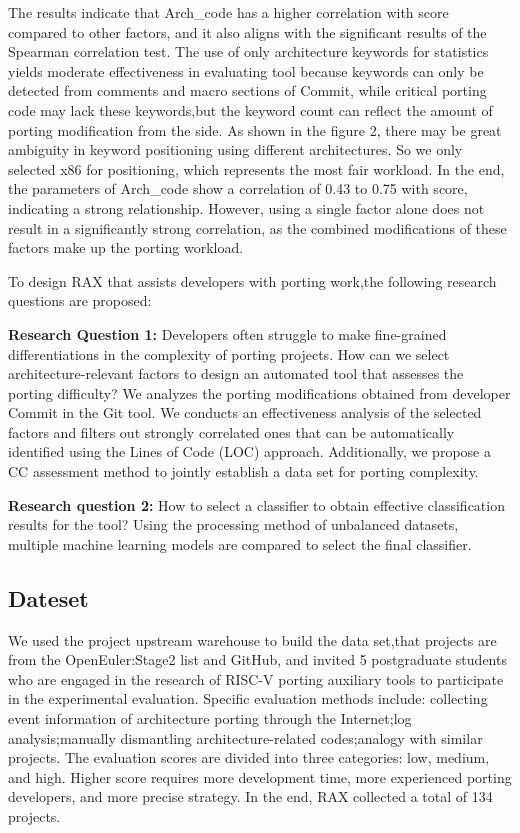 \documentclass[sigconf,screen,review]{acmart}
\begin{document}
The results indicate that Arch\_code has a higher correlation with score compared to other factors, and it also aligns with the significant results of the Spearman correlation test.
The use of only architecture keywords for statistics yields moderate effectiveness in evaluating tool because keywords can only be detected from comments and macro sections of Commit, while critical porting code may lack these keywords,but the keyword count can reflect the amount of porting modification from the side.
As shown in the figure 2, there may be great ambiguity in keyword positioning using different architectures.
So we only selected x86 for positioning, which represents the most fair workload.
In the end, the parameters of Arch\_code show a correlation of 0.43 to 0.75 with score, indicating a strong relationship.
However, using a single factor alone does not result in a significantly strong correlation, as the combined modifications of these factors make up the porting workload.

To design RAX that assists developers with porting work,the following research questions are proposed:

\textbf{Research Question 1:} Developers often struggle to make fine-grained differentiations in the complexity of porting projects.
How can we select architecture-relevant factors to design an automated tool that assesses the porting difficulty?
We analyzes the porting modifications obtained from developer Commit in the Git tool.
We conducts an effectiveness analysis of the selected factors and filters out strongly correlated ones that can be automatically identified using the Lines of Code (LOC) approach.
Additionally, we propose a CC assessment method to jointly establish a data set for porting complexity.

\textbf{Research question 2:} How to select a classifier to obtain effective classification results for the tool?
Using the processing method of unbalanced datasets, multiple machine learning models are compared to select the final classifier.

\subsection{Dateset}
We used the project upstream warehouse to build the data set,that projects are from the OpenEuler:Stage2 list and GitHub, and invited 5 postgraduate students who are engaged in the research of RISC-V porting auxiliary tools to participate in the experimental evaluation.
Specific evaluation methods include: collecting event information of architecture porting through the Internet;log analysis;manually dismantling architecture-related codes;analogy with similar projects.
The evaluation scores are divided into three categories: low, medium, and high.
Higher score requires more development time, more experienced porting developers, and more precise strategy.
In the end, RAX collected a total of 134 projects.
\end{document}

